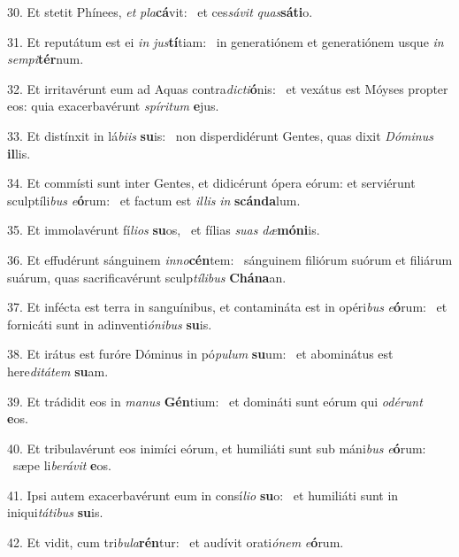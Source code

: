 30. Et stetit Phínees, \textit{et} \textit{pla}\textbf{cá}vit: \ast\  et ces\textit{sá}\textit{vit} \textit{quas}\textbf{sá}\textbf{ti}o.\

31. Et reputátum est ei \textit{in} \textit{jus}\textbf{tí}tiam: \ast\  in generatiónem et generatiónem usque \textit{in} \textit{sem}\textit{pi}\textbf{tér}num.\

32. Et irritavérunt eum ad Aquas contra\textit{dic}\textit{ti}\textbf{ó}nis: \ast\  et vexátus est Móyses propter eos: quia exacerbavérunt \textit{spí}\textit{ri}\textit{tum} \textbf{e}jus.\

33. Et distínxit in lá\textit{bi}\textit{is} \textbf{su}is: \ast\  non disperdidérunt Gentes, quas dixit \textit{Dó}\textit{mi}\textit{nus} \textbf{il}lis.\

34. Et commísti sunt inter Gentes, et didicérunt ópera eórum: et serviérunt sculptíli\textit{bus} \textit{e}\textbf{ó}rum: \ast\  et factum est \textit{il}\textit{lis} \textit{in} \textbf{scán}\textbf{da}lum.\

35. Et immolavérunt fí\textit{li}\textit{os} \textbf{su}os, \ast\  et fílias \textit{su}\textit{as} \textit{dæ}\textbf{mó}\textbf{ni}is.\

36. Et effudérunt sánguinem \textit{in}\textit{no}\textbf{cén}tem: \ast\  sánguinem filiórum suórum et filiárum suárum, quas sacrificavérunt sculp\textit{tí}\textit{li}\textit{bus} \textbf{Chá}\textbf{na}an.\

37. Et infécta est terra in sanguínibus, et contamináta est in opéri\textit{bus} \textit{e}\textbf{ó}rum: \ast\  et fornicáti sunt in adinventi\textit{ó}\textit{ni}\textit{bus} \textbf{su}is.\

38. Et irátus est furóre Dóminus in pó\textit{pu}\textit{lum} \textbf{su}um: \ast\  et abominátus est here\textit{di}\textit{tá}\textit{tem} \textbf{su}am.\

39. Et trádidit eos in \textit{ma}\textit{nus} \textbf{Gén}tium: \ast\  et domináti sunt eórum qui \textit{o}\textit{dé}\textit{runt} \textbf{e}os.\

40. Et tribulavérunt eos inimíci eórum, et humiliáti sunt sub máni\textit{bus} \textit{e}\textbf{ó}rum: \ast\  sæpe li\textit{be}\textit{rá}\textit{vit} \textbf{e}os.\

41. Ipsi autem exacerbavérunt eum in consí\textit{li}\textit{o} \textbf{su}o: \ast\  et humiliáti sunt in iniqui\textit{tá}\textit{ti}\textit{bus} \textbf{su}is.\

42. Et vidit, cum tri\textit{bu}\textit{la}\textbf{rén}tur: \ast\  et audívit orati\textit{ó}\textit{nem} \textit{e}\textbf{ó}rum.\

